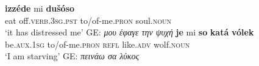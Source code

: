 \documentclass[output=paper,colorlinks,citecolor=brown]{langscibook}
\begin{document}
\begin{xlist}
\ex
\gll \textbf{{izzéde}} mi \textbf{{dušóso}}\\
{eat off}.\textsc{verb.3sg.pst} to/of-me.\textsc{pron} soul.\textsc{noun}\\
\glt `it has distressed me' GE:  \textit{μου έφαγε την ψυχή}
\ex
\gll \textbf{{je}}  mi \textbf{{so}} \textbf{{katá}} \textbf{{vólek}}\\
{be}.\textsc{aux.1sg} to/of-me.\textsc{pron}  \textsc{refl} like.\textsc{adv}  wolf.\textsc{noun}\\
\glt `I am starving' GE:  \textit{ πεινάω σα λύκος}


\end{xlist}
\end{document}

